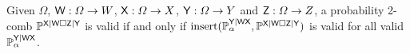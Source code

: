 

\begin{theorem}\label{th:extension_2comb_valid}
Given $\Omega$, $\mathsf{W}:\Omega\to W$, $\mathsf{X}:\Omega\to X$, $\mathsf{Y}:\Omega\to Y$ and $\mathsf{Z}:\Omega\to Z$, a probability 2-comb $\mathbb{P}^{\mathsf{X}|\mathsf{W}\square\mathsf{Z}|\mathsf{Y}}$ is valid if and only if $\text{insert}(\mathbb{P}_\alpha^{\mathsf{Y}|\mathsf{WX}},\mathbb{P}^{\mathsf{X}|\mathsf{W}\square\mathsf{Z}|\mathsf{Y}})$ is valid for all valid $\mathbb{P}_\alpha^{\mathsf{Y}|\mathsf{WX}}$.
\end{theorem}

